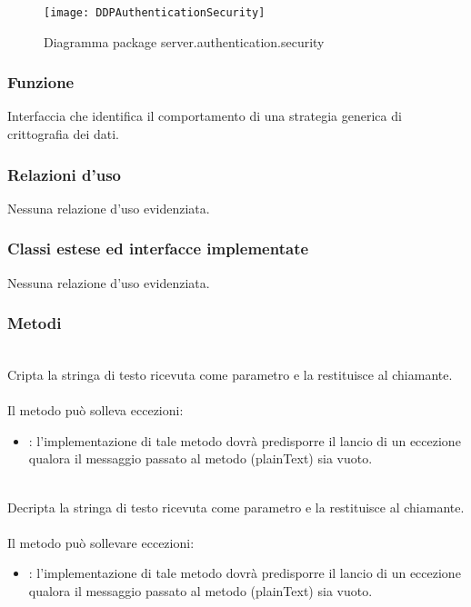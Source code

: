 \begin{center}
\begin{figure}[H]
  \texttt{[image: DDPAuthenticationSecurity]}
\caption{Diagramma package server.authentication.security}
\end{figure}
\end{center}


\subsubsection*{Funzione}
Interfaccia che identifica il comportamento di una strategia generica di crittografia dei dati.

\subsubsection*{Relazioni d'uso}
Nessuna relazione d'uso evidenziata.

\subsubsection*{Classi estese ed interfacce implementate}

Nessuna relazione d'uso evidenziata.

\subsubsection*{Metodi}
\begin{description}
	\item{}\\
	Cripta la stringa di testo ricevuta come parametro e la restituisce al chiamante.\\\\
	Il metodo può solleva eccezioni:
	\begin{itemize}
		\item {}: l'implementazione di tale metodo dovrà predisporre il lancio di un eccezione qualora il messaggio passato al metodo (plainText) sia vuoto.
	\end{itemize}
	\item{}\\
	Decripta la stringa di testo ricevuta come parametro e la restituisce al chiamante.\\\\
	Il metodo può sollevare eccezioni:
	\begin{itemize}
		\item {}: l'implementazione di tale metodo dovrà predisporre il lancio di un eccezione qualora il messaggio passato al metodo (plainText) sia vuoto.
	\end{itemize}
\end{description}

